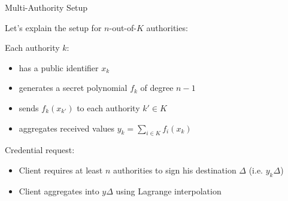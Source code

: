 \begin{frame}{Multi-Authority Setup}

    Let's explain the setup for $n$-out-of-$K$ authorities:

    \vfill

    Each authority $k$:
    \begin{itemize}
        \item has a public identifier $x_k$
        \item generates a secret polynomial $f_k$ of degree $n-1$
        \item sends $f_k(x_{k'})$ to each authority $k' \in K$ 
        \item aggregates received values $y_k = \sum_{i \in K} f_i(x_k)$
    \end{itemize}

    \vfill

    Credential request:
    \begin{itemize}
        \item Client requires at least $n$ authorities to sign his destination $\Delta$ (i.e. $y_k \Delta$)
        \item Client aggregates into $y \Delta$ using Lagrange interpolation 
    \end{itemize}
\end{frame}